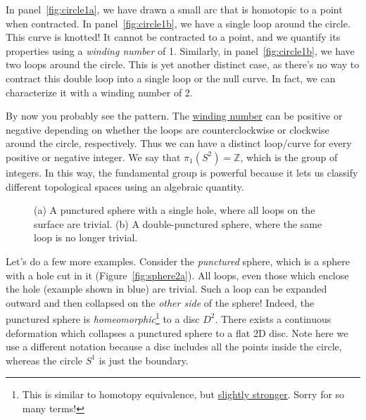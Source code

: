 \documentclass[12pt, english]{book}
\begin{document}
In panel~\ref{fig:circle1a}, we have drawn a small arc that is homotopic to a point when contracted. 
In panel~\ref{fig:circle1b}, we have a single loop around the circle.
This curve is knotted! 
It cannot be contracted to a point, and we quantify its properties using a \emph{winding number} of 1.
Similarly, in panel~\ref{fig:circle1b}, we have two loops around the circle.
This is yet another distinct case, as there's no way to contract this double loop into a single loop or the null curve. 
In fact, we can characterize it with a winding number of 2.

By now you probably see the pattern. 
The \href{https://en.wikipedia.org/wiki/Winding_number}{winding number} can be positive or negative depending on whether the loops are counterclockwise or clockwise around the circle, respectively.
Thus we can have a distinct loop/curve for every positive or negative integer.
We say that $\pi_1(S^2) = \mathbb{Z}$, which is the group of integers.
In this way, the fundamental group is powerful because it lets us classify different topological spaces using an algebraic quantity.

\begin{figure}[!ht]
	\centering 
	 \hspace{6ex}
	\caption{(a) A punctured sphere with a single hole, where all loops on the surface are trivial.
	(b) A double-punctured sphere, where the same loop is no longer trivial.}
	\label{fig:sphere2}
\end{figure}

Let's do a few more examples. 
Consider the \emph{punctured} sphere, which is a sphere with a hole cut in it (Figure~\ref{fig:sphere2a}).
All loops, even those which enclose the hole (example shown in blue) are trivial.
Such a loop can be expanded outward and then collapsed on the \emph{other side} of the sphere!
Indeed, the punctured sphere is \emph{homeomorphic}\footnote{This is similar to homotopy equivalence, but \href{https://en.wikipedia.org/wiki/Homotopy\#Homotopy_equivalence_vs._homeomorphism}{slightly stronger}. Sorry for so many terms!} to a disc $D^2$.
There exists a continuous deformation which collapses a punctured sphere to a flat 2D disc.
Note here we use a different notation because a disc includes all the points inside the circle, whereas the circle $S^1$ is just the boundary.
\end{document}
